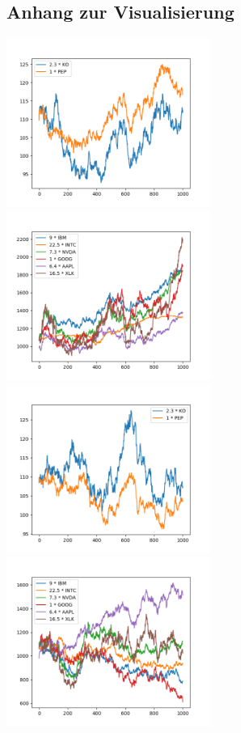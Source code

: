\documentclass[12pt]{article}
\begin{document}
\subsection*{Anhang zur Visualisierung}

\includegraphics[width=0.5\textwidth]{Teil1_1}	
\includegraphics[width=0.5\textwidth]{Teil2_1}
\includegraphics[width=0.5\textwidth]{Teil1_2}	
\includegraphics[width=0.5\textwidth]{Teil2_2}
\end{document}
